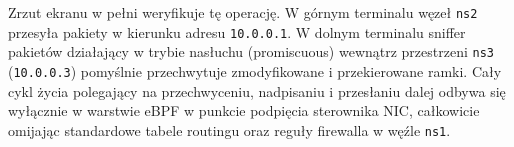 \documentclass[11pt,a4paper]{article}
\begin{document}
Zrzut ekranu w pełni weryfikuje tę operację. W górnym terminalu węzeł \texttt{ns2} przesyła pakiety w kierunku adresu \texttt{10.0.0.1}. W dolnym terminalu sniffer pakietów działający w trybie nasłuchu (promiscuous) wewnątrz przestrzeni \texttt{ns3} (\texttt{10.0.0.3}) pomyślnie przechwytuje zmodyfikowane i przekierowane ramki. Cały cykl życia polegający na przechwyceniu, nadpisaniu i przesłaniu dalej odbywa się wyłącznie w warstwie eBPF w punkcie podpięcia sterownika NIC, całkowicie omijając standardowe tabele routingu oraz reguły firewalla w węźle \texttt{ns1}.
\end{document}
